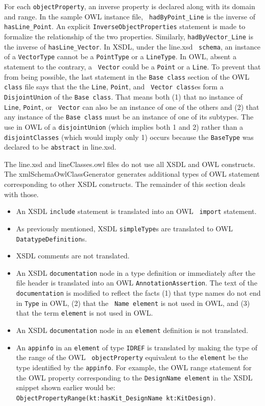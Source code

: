 \documentclass[preprint,12pt]{elsarticle}
\begin{document}
For each {\tt objectProperty}, an inverse property is declared along with
its domain and range. In the sample OWL instance file, {\tt
  hadByPoint\_Line} is the inverse of {\tt hasLine\_Point}. An explicit
{\tt InverseObjectProperties} statement is made to formalize the
relationship of the two properties. Similarly, {\tt hadByVector\_Line} is
the inverse of {\tt hasLine\_Vector}. In XSDL, under the line.xsd {\tt
  schema}, an instance of a {\tt VectorType} cannot be a {\tt PointType} or
a {\tt LineType}. In OWL, absent a statement to the contrary, a {\tt
  Vector} could be a {\tt Point} or a {\tt Line}. To prevent that from
being possible, the last statement in the {\tt Base class} section of the
OWL {\tt class} file says that the the {\tt Line}, {\tt Point}, and {\tt
  Vector class}es form a {\tt DisjointUnion} of the {\tt Base class}.
That means both (1) that no instance of {\tt Line}, {\tt Point}, or {\tt
  Vector} can also be an instance of one of the others and (2) that any
instance of the {\tt Base class} must be an instance of one of its
subtypes. The use in OWL of a {\tt disjointUnion} (which implies both 1 and
2) rather than a {\tt disjointClasses} (which would imply only 1) occurs
because the {\tt BaseType} was declared to be {\tt abstract} in line.xsd.

The line.xsd and lineClasses.owl files do not use all XSDL and OWL
constructs. The xmlSchemaOwlClassGenerator generates additional types of
OWL statement corresponding to other XSDL constructs. The remainder of this
section deals with those.

\begin{itemize}
\item An XSDL {\tt include} statement is translated into an OWL {\tt
  import} statement.
\item As previously mentioned, XSDL {\tt simpleType}s are translated to OWL
  {\tt DatatypeDefinition}s.
\item XSDL comments are not translated.
\item An XSDL {\tt documentation} node in a type definition or immediately
  after the file header is translated into an OWL {\tt AnnotationAssertion}.
  The text of the {\tt documentation} is modified to reflect the facts
  (1) that type names do not end in {\tt Type} in OWL, (2) that the {\tt
    Name element} is not used in OWL, and (3) that the term {\tt element}
  is not used in OWL.
\item An XSDL {\tt documentation} node in an {\tt element} definition is
  not translated.
\item An {\tt appinfo} in an {\tt element} of type {\tt IDREF} is
  translated by making the type of the range of the OWL {\tt
    objectProperty} equivalent to the {\tt element} be the type identified
  by the {\tt appinfo}. For example, the OWL range statement for the OWL
  property corresponding to the {\tt DesignName element} in the XSDL
  snippet shown earlier would be: {\tt
    ObjectPropertyRange(kt:hasKit\_DesignName kt:KitDesign)}.
\end{itemize}
\end{document}
